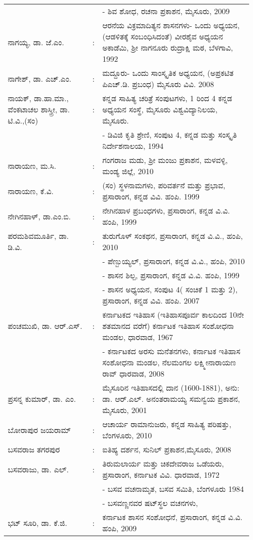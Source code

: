 \begin{longtable}[l]{@{}>{\raggedright}p{4.7cm}cp{9.2cm}<{\raggedright}@{}}
&& - ಶಿವ ಶೋಧ, ರಚನಾ ಪ್ರಕಾಶನ, ಮೈಸೂರು, 2009\\
ನಾಗಯ್ಯ, ಡಾ. ಜೆ.ಎಂ. & : & ಆರನೆಯ ವಿಕ್ರಮಾದಿತ್ಯನ ಶಾಸನಗಳು- ಒಂದು ಅಧ್ಯಯನ, (ಆಡಳಿತಕ್ಕೆ ಸಂಬಂಧಿಸಿದಂತೆ) ವೀರಶೈವ ಅಧ್ಯಯನ ಅಕಾಡೆಮಿ, ಶ‍್ರೀ ನಾಗನೂರು ರುದ್ರಾಕ್ಷಿ ಮಠ, ಬೆಳಗಾವಿ, 1992\\
ನಾಗೇಶ್​, ಡಾ. ಎಚ್​.ಎಂ. & : &  ಮದ್ದೂರು- ಒಂದು ಸಾಂಸ್ಕೃತಿಕ ಅಧ್ಯಯನ, (ಅಪ್ರಕಟಿತ ಪಿಎಚ್​.ಡಿ. ಪ್ರಬಂಧ) ಮೈಸೂರು ವಿವಿ. 2008\\
ನಾಯಕ್​, ಡಾ.ಹಾ.ಮಾ., ವೆಂಕಟಾಚಲ ಶಾಸ್ತ್ರೀ, ಡಾ. ಟಿ.ವಿ.,(ಸಂ) & : &  ಕನ್ನಡ ಸಾಹಿತ್ಯ ಚರಿತ್ರೆ ಸಂಪುಟಗಳು, 1 ರಿಂದ 4 ಕನ್ನಡ ಅಧ್ಯಯನ ಸಂಸ್ಥೆ, ಮೈಸೂರು ವಿಶ್ವವಿದ್ಯಾನಿಲಯ, ಮೈಸೂರು.\\
&& - ಡಿವಿಜಿ ಕೃತಿ ಶ್ರೇಣಿ, ಸಂಪುಟ 4, ಕನ್ನಡ ಮತ್ತು ಸಂಸ್ಕೃತಿ ನಿರ್ದೇಶನಾಲಯ, 1994\\
ನಾರಾಯಣ, ಮ.ಸಿ. & : &  ಗಂಗರಾಜ ಮಡು, ಶ‍್ರೀ ಮಂಜು ಪ್ರಕಾಶನ, ಮಳವಳ್ಳಿ, ಮಂಡ್ಯ ಜಿಲ್ಲೆ, 2010\\
ನಾರಾಯಣ, ಕೆ.ವಿ. & : & (ಸಂ) ಸ್ಥಳನಾಮಗಳು, ಪರಿವರ್ತನೆ ಮತ್ತು ಪ್ರಭಾವ, ಪ್ರಸಾರಾಂಗ, ಕನ್ನಡ ವಿವಿ. ಹಂಪಿ. 1999\\
ನೇಗಿನಹಾಳ್​, ಡಾ.ಎಂ.ಬಿ. & : &  ನೇಗಿನಹಾಳ ಪ್ರಬಂಧಗಳು, ಪ್ರಸಾರಾಂಗ, ಕನ್ನಡ ವಿ.ವಿ. ಹಂಪಿ, 1999\\
ಪರಮಶಿವಮೂರ್ತಿ, ಡಾ. ಡಿ.ವಿ. & : & ತುರುಗೊಳ್​ ಸಂಕಥನ, ಪ್ರಸಾರಾಂಗ, ಕನ್ನಡ ವಿ.ವಿ., ಹಂಪಿ, 2010\\
&& - ಪೆಣ್ಬುಯ್ಯಲ್​, ಪ್ರಸಾರಾಂಗ, ಕನ್ನಡ ವಿ.ವಿ., ಹಂಪಿ, 2010\\
&& - ಶಾಸನ ಶಿಲ್ಪ, ಪ್ರಸಾರಾಂಗ, ಕನ್ನಡ ವಿ.ವಿ. ಹಂಪಿ, 1999\\
&& - ಶಾಸನ ಅಧ್ಯಯನ, ಸಂಪುಟ 4( ಸಂಚಿಕೆ 1 ಮತ್ತು 2), ಪ್ರಸಾರಾಂಗ, ಕನ್ನಡ ವಿವಿ. ಹಂಪಿ. 2007\\
ಪಂಚಮುಖಿ, ಡಾ. ಆರ್​.ಎಸ್​. & : &  ಕರ್ನಾಟಕದ ಇತಿಹಾಸ (ಇತಿಹಾಸಪೂರ್ವ ಕಾಲದಿಂದ 10ನೇ ಶತಮಾನದ ವರೆಗೆ) ಕರ್ನಾಟಕ ಇತಿಹಾಸ ಸಂಶೋಧನಾ ಮಂಡಲ, ಧಾರವಾಡ, 1967\\
&& - ಕರ್ನಾಟಕದ ಅರಸು ಮನೆತನಗಳು, ಕರ್ನಾಟಕ ಇತಿಹಾಸ ಸಂಶೋಧನಾ ಮಂಡಲ, ನೆಲಮಂಗಲ ಲಕ್ಷ್ಮೀನಾರಾಯಣ ರಾವ್​ ಧಾರವಾಡ, 2008\\
ಪ್ರಸನ್ನ ಕುಮಾರ್​, ಡಾ. ಎಂ. & : &  ಮೈಸೂರಿನ ಇತಿಹಾಸದಲ್ಲಿ ದಾನ (1600-1881), ಅನು: ಡಾ. ಆರ್​.ಎಲ್​. ಅನಂತರಾಮಯ್ಯ ಸಮನ್ವಯ ಪ್ರಕಾಶನ, ಮೈಸೂರು, 2001\\
ಬೋರಾಪುರ ಜಯರಾಮ್ & : &  ಆಚಾರ್ಯ ರಾಮಾನುಜರು, ಕನ್ನಡ ಸಾಹಿತ್ಯ ಪರಿಷತ್ತು, ಬೆಂಗಳೂರು, 2010\\
ಬಸವರಾಜ ತಗರಪುರ & : & ಐತಿಹ್ಯ ದರ್ಶನ, ಸುನಿಲ್​ ಪ್ರಕಾಶನ,ಮೈಸೂರು, 2008\\
ಬಸವರಾಜು, ಡಾ. ಎಲ್​. & : & ತಿರುಮಲಾರ್ಯ ಮತ್ತು ಚಿಕದೇವರಾಜ ಒಡೆಯರು, ಪ್ರಸಾರಾಂಗ, ಕರ್ನಾಟಕ ವಿವಿ. ಧಾರವಾಡ, 1972\\
&& - ಬಸವ ವಚನಾಮೃತ, ಬಸವ ಸಮಿತಿ, ಬೆಂಗಳೂರು 1984\\
&& - ಬಸವಣ್ಣನವರ ಷಟ್​ಸ್ಥಲ ವಚನಗಳು,\\
ಭಟ್​ ಸೂರಿ, ಡಾ. ಕೆ.ಜಿ. & : & ಕರ್ನಾಟಕ ಶಾಸನ ಸಂಶೋಧನೆ, ಪ್ರಸಾರಾಂಗ, ಕನ್ನಡ ವಿ.ವಿ. ಹಂಪಿ, 2009\\

\end{longtable}
